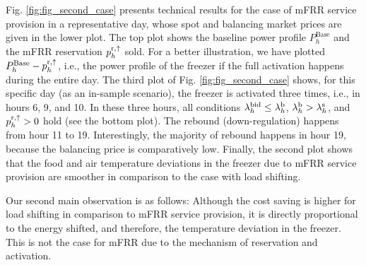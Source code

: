 
Fig. \ref{fig:fig_second_case} presents technical results for the case of mFRR service provision in a representative day, whose spot and balancing market prices are given in the lower plot. The top plot shows the baseline power profile $P^{\text{Base}}_{h}$ and the mFRR reservation $p^{\rm{r}, \uparrow}_{h}$ sold. For a better illustration, we have plotted $P^{\text{Base}}_{h}-p^{\rm{r}, \uparrow}_{h}$, i.e., the power profile of the freezer if the full activation happens during the entire day. The third  plot of Fig. \ref{fig:fig_second_case} shows, for this specific day (as an in-sample scenario), the freezer is activated three times, i.e., in hours 6, 9, and 10. In these three hours, all conditions $\lambda_{h}^{\rm{bid}} \leq \lambda_{h}^{\rm{b}}$, $\lambda_{h}^{\rm{b}} > \lambda_{h}^{\rm{s}}$, and $p^{\rm{r},\uparrow}_{h} > 0$ hold (see the bottom plot). The rebound (down-regulation) happens from hour 11 to 19. Interestingly, the majority of rebound happens in hour 19, because the balancing price is comparatively low. Finally, the second plot shows that the food and air temperature deviations in the freezer due to mFRR service provision are smoother in comparison to the case with load shifting. 



Our second main observation is as follows: Although the cost saving is higher for load shifting in comparison to mFRR service provision, it is directly proportional to the energy shifted, and therefore, the temperature deviation in the freezer. This is not the case for mFRR due to the mechanism of reservation and activation.



